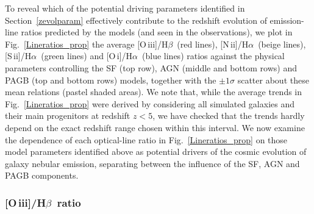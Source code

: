 \documentclass[fleqn,usenatbib]{mnras}
\newcommand{\oiiihb}{\hbox{[O\,{\sc iii}]/H$\beta$}}
\newcommand{\niiha}{\hbox{[N\,{\sc ii}]/H$\alpha$}}
\newcommand{\siiha}{\hbox{[S\,{\sc ii}]/H$\alpha$}}
\newcommand{\oiha}{\hbox{[O\,{\sc i}]/H$\alpha$}}
\begin{document}
To reveal which of the potential driving parameters identified in
Section~\ref{zevolparam}   effectively contribute to the redshift
evolution of emission-line ratios predicted by the  models (and seen
in the observations), we plot in Fig.~\ref{Lineratios_prop} the
average  \oiiihb\ (red lines), \niiha\ (beige lines), \siiha\ (green
lines) and \oiha\ (blue lines) ratios  against the physical parameters
controlling the SF (top row), AGN (middle and bottom rows) and PAGB
(top and bottom rows) models, together with the $\pm1\sigma$ scatter
about these mean  relations (pastel shaded areas). We note that, while
the average trends in Fig.~\ref{Lineratios_prop} were derived by
considering all simulated galaxies and their main progenitors at
redshift $z<5$, we have checked that the trends hardly depend on the
exact redshift range  chosen within this interval. We now examine the
dependence of each optical-line ratio in Fig.~\ref{Lineratios_prop} on
those model parameters identified above as potential  drivers of the
cosmic evolution of galaxy nebular emission, separating between the
influence  of the SF, AGN and PAGB components. 

\subsubsection{\oiiihb\ ratio}\label{OIII} 



\begin{figure*}
\caption{Average \oiiihb\ (red), \niiha\ (beige), \siiha\ (green) and \oiha\ (blue) ratios of 
the 20 simulated massive galaxies of Section~\ref{theory} and their main high-redshift 
progenitors (thick lines), plotted against the same galaxy physical parameters as in 
Fig.~\ref{Propevol}, plus the mean metallicity of stars older than 3\,Gyr ($Z_\mathrm{PAGB}$).
Shaded areas show the $\pm1\sigma$ scatter around the mean relations.}\label{Lineratios_prop}        
\end{figure*}
\end{document}
